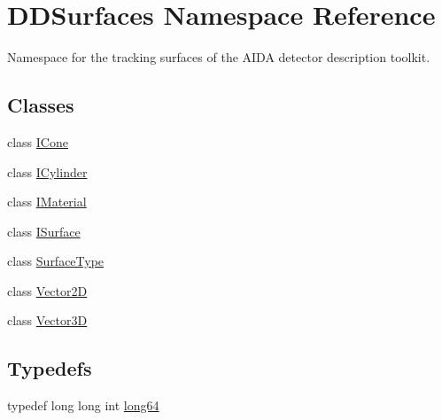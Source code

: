 \hypertarget{namespace_d_d_surfaces}{}\section{D\+D\+Surfaces Namespace Reference}
\label{namespace_d_d_surfaces}


Namespace for the tracking surfaces of the A\+I\+DA detector description toolkit.  


\subsection*{Classes}
\begin{DoxyCompactItemize}
\item 
class \hyperlink{class_d_d_surfaces_1_1_i_cone}{I\+Cone}
\item 
class \hyperlink{class_d_d_surfaces_1_1_i_cylinder}{I\+Cylinder}
\item 
class \hyperlink{class_d_d_surfaces_1_1_i_material}{I\+Material}
\item 
class \hyperlink{class_d_d_surfaces_1_1_i_surface}{I\+Surface}
\item 
class \hyperlink{class_d_d_surfaces_1_1_surface_type}{Surface\+Type}
\item 
class \hyperlink{class_d_d_surfaces_1_1_vector2_d}{Vector2D}
\item 
class \hyperlink{class_d_d_surfaces_1_1_vector3_d}{Vector3D}
\end{DoxyCompactItemize}
\subsection*{Typedefs}
\begin{DoxyCompactItemize}
\item 
typedef long long int \hyperlink{namespace_d_d_surfaces_ab6b3da366f31f80aec56447ac4442e78}{long64}
\end{DoxyCompactItemize}
